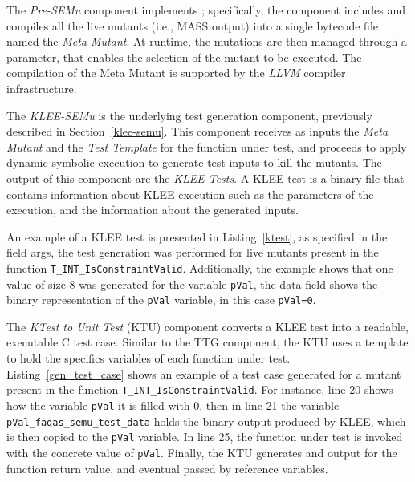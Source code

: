 The \emph{Pre-SEMu} component implements ; specifically, the component includes and compiles all the live mutants (i.e., MASS output) into a single bytecode file named the \emph{Meta Mutant}. At runtime, the mutations are then managed through a parameter, that enables the selection of the mutant to be executed. The compilation of the Meta Mutant is supported by the \emph{LLVM} compiler infrastructure. 



The \emph{KLEE-SEMu} is the underlying test generation component, previously described in Section~\ref{klee-semu}. This component receives as inputs the \emph{Meta Mutant} and the \emph{Test Template} for the function under test, and proceeds to apply dynamic symbolic execution to generate test inputs to kill the mutants. The output of this component are the \emph{KLEE Tests}.
A KLEE test is a binary file that contains information about KLEE execution such as the parameters of the execution, and the information about the generated inputs.

An example of a KLEE test is presented in Listing~\ref{ktest}, as specified in the field args, the test generation was performed for live mutants present in the function \texttt{T\_INT\_IsConstraintValid}. Additionally, the example shows that one value of size 8 was generated for the variable \texttt{pVal}, the data field shows the binary representation of the \texttt{pVal} variable, in this case \texttt{pVal=0}.




The \emph{KTest to Unit Test} (KTU) component converts a KLEE test into a readable, executable C test case. Similar to the TTG component, the KTU uses a template to hold the specifics variables of each function under test. 
Listing~\ref{gen_test_case} shows an example of a test case generated for a mutant present in the function \texttt{T\_INT\_IsConstraintValid}. For instance, line 20 shows how the variable \texttt{pVal} it is filled with 0, then in line 21 the variable \texttt{pVal\_faqas\_semu\_test\_data} holds the binary output produced by KLEE, which is then copied to the \texttt{pVal} variable. In line 25, the function under test is invoked with the concrete value of \texttt{pVal}. Finally, the KTU generates and output for the function return value, and eventual passed by reference variables.

